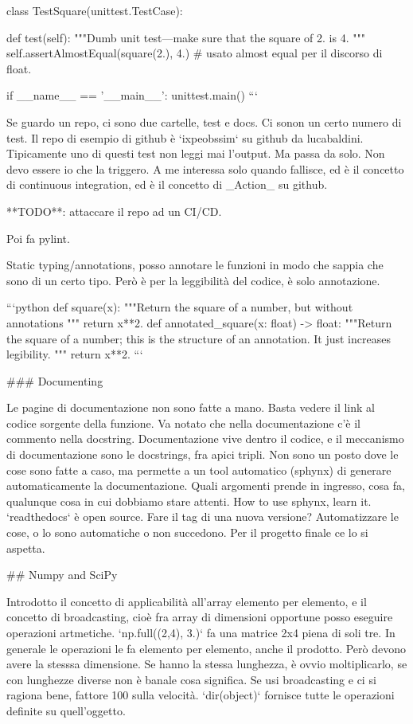 \documentclass[10pt, a4paper, twosided, titlepage, draft]{book}
\begin{document}
class TestSquare(unittest.TestCase):

def test(self):
"""Dumb unit test---make sure that the square of 2. is 4.
"""
self.assertAlmostEqual(square(2.), 4.) # usato almost equal per il discorso di float.

if __name__ == ’__main__’:
unittest.main()
```

Se guardo un repo, ci sono due cartelle, test e docs. Ci sonon un certo numero di test. Il repo di esempio di github è `ixpeobssim` su github da lucabaldini.
Tipicamente uno di questi test non leggi mai l'output. Ma passa da solo. Non devo essere io che la triggero. A me interessa solo quando fallisce, ed è il concetto di continuous integration, ed è il concetto di _Action_ su github.

**TODO**: attaccare il repo ad un CI/CD.

Poi fa pylint.

Static typing/annotations, posso annotare le funzioni in modo che sappia che sono di un certo tipo. Però è per la leggibilità del codice, è solo annotazione.

```python
def square(x):
"""Return the square of a number, but without annotations
"""
return x**2.
def annotated_square(x: float) -> float:
"""Return the square of a number; this is the structure of an annotation.
It just increases legibility.
"""
return x**2.
```

### Documenting

Le pagine di documentazione non sono fatte a mano. Basta vedere il link al codice sorgente della funzione. 
Va notato che nella documentazione c'è il commento nella docstring.
Documentazione vive dentro il codice, e il meccanismo di documentazione sono le docstrings, fra apici tripli.
Non sono un posto dove le cose sono fatte a caso, ma permette a un tool automatico (sphynx) di generare automaticamente la documentazione.
Quali argomenti prende in ingresso, cosa fa, qualunque cosa in cui dobbiamo stare attenti.
How to use sphynx, learn it. `readthedocs` è open source.
Fare il tag di una nuova versione?
Automatizzare le cose, o lo sono automatiche o non succedono.
Per il progetto finale ce lo si aspetta.

## Numpy and SciPy

Introdotto il concetto di applicabilità all'array elemento per elemento, e il concetto di broadcasting, cioè fra array di dimensioni opportune posso eseguire operazioni artmetiche.
`np.full((2,4), 3.)` fa una matrice 2x4 piena di soli tre.
In generale le operazioni le fa elemento per elemento, anche il prodotto. Però devono avere la stesssa dimensione.
Se hanno la stessa lunghezza, è ovvio moltiplicarlo, se con lunghezze diverse non è banale cosa significa.
Se usi broadcasting e ci si ragiona bene, fattore 100 sulla velocità.
`dir(object)` fornisce tutte le operazioni definite su quell'oggetto.
\end{document}
